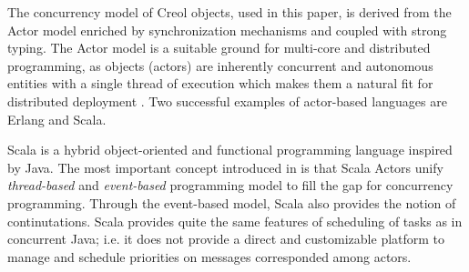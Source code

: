 





The concurrency model of Creol objects, used in this paper, is derived from the
Actor model enriched by synchronization mechanisms and coupled with strong
typing. The Actor model \cite{actors:agha} is a suitable ground for multi-core and distributed 
programming, as objects (actors) are inherently concurrent and autonomous
entities with a single thread of execution which makes them a natural fit for
distributed deployment \cite{actor_frameworks_jvm:agha}. Two successful examples
of actor-based languages are Erlang and Scala. 

Scala is a hybrid object-oriented and functional programming language inspired
by Java. The most important concept introduced in
\cite{scala_actors:ordersky,coord:ordersky} is that Scala Actors unify
\textit{thread-based} and \textit{event-based} programming model to fill the gap
for concurrency programming. Through the event-based model, Scala also
provides the notion of continutations. Scala provides quite the same
features of
scheduling of tasks as in concurrent Java; i.e. it does not provide a direct and
customizable platform to manage and schedule priorities on messages
corresponded among actors.


